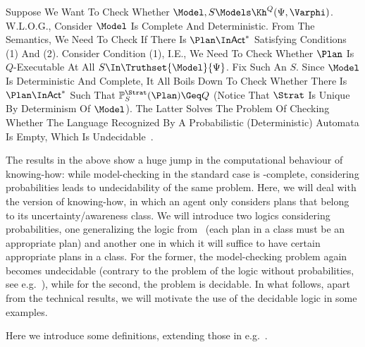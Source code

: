     Suppose We Want To Check Whether $\Model,S\Models\Kh^Q(\Psi,\Varphi)$.  W.L.O.G., Consider $\Model$ Is Complete And Deterministic. 
    From The Semantics, We Need To Check If There Is $\Plan\In\ACT^*$ Satisfying Conditions (1) And (2). Consider Condition (1), I.E., We Need To Check Whether $\Plan$ Is $Q$-Executable At All $S\In\Truthset{\Model}{\Psi}$. Fix Such An $S$. Since $\Model$ Is Deterministic And Complete, It All Boils Down To Check Whether There Is $\Plan\In\ACT^*$ Such That $\Prob^\Strat_S(\Plan)\Geq Q$ (Notice That $\Strat$ Is Unique By Determinism Of $\Model$). 
    The Latter Solves The Problem Of Checking Whether The Language Recognized By A Probabilistic (Deterministic) Automata Is Empty, Which Is Undecidable~\Cite{MadaniHC99}. 



The results in the above show a huge jump in the computational behaviour of knowing-how: while model-checking in the standard case is \PSPACE-complete, considering probabilities leads to undecidability of the same problem. Here, we will deal with the version of knowing-how, in which an agent only considers plans that belong to its uncertainty/awareness class. We will introduce two logics considering probabilities, one generalizing the logic from~\cite{AFSVQ21,AFSVQ23} (each plan in a class must be an appropriate plan) and another one in which it will suffice to have certain appropriate plans in a class. For the former, the model-checking problem again becomes undecidable (contrary to the \PTIME problem of the logic without probabilities, see e.g.~\cite{AFSVQ21,AFSVQ23,DF23}), while for the second, the problem is decidable. In what follows, apart from the technical results, we will motivate the use of the decidable logic in some examples.

Here we introduce some definitions, extending those in e.g.~\cite{AFSVQ21,AFSVQ23}.


